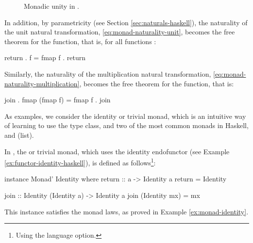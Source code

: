 \begin{figure}[htb]
  \begin{center}
  \end{center}
  \caption{Monadic unity in \hask.}
  \label{fig:monad-unity-haskell}
\end{figure}

In addition, by parametricity (see Section
\ref{sec:naturals-haskell}), the naturality of the unit natural
transformation, \eqref{eq:monad-naturality-unit}, becomes the free
theorem for the  function, that is, for all
functions :
\begin{codehaskell}
return . f = fmap f . return
\end{codehaskell}
Similarly, the naturality of the multiplication natural
transformation, \eqref{eq:monad-naturality-multiplication}, becomes
the free theorem for the  function, that is:
\begin{codehaskell}
join . fmap (fmap f) = fmap f . join
\end{codehaskell}

As examples, we consider the identity or trivial monad, which is an
intuitive way of learning to use the  type class,
and two of the most common monads in Haskell,  and
\texthaskell{[]} (list).

\begin{example}
  \label{ex:monad-identity-haskell}

  In \hask, the  or trivial monad, which uses
  the identity endofunctor (see Example
  \ref{ex:functor-identity-haskell}), is defined as
  follows\footnote{Using the  language
    option.}:
  \begin{codehaskell}
instance Monad' Identity where
  return :: a -> Identity a
  return = Identity

  join :: Identity (Identity a) -> Identity a
  join (Identity mx) = mx
  \end{codehaskell}
  This instance satisfies the monad laws, as proved in Example
  \ref{ex:monad-identity}.

\end{example}

